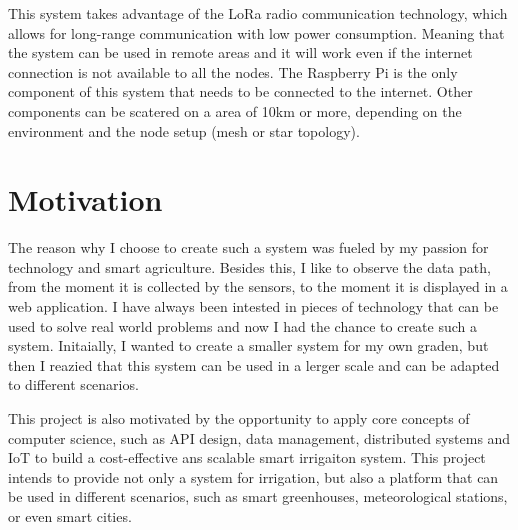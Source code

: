 This system takes advantage of the LoRa radio communication technology, 
which allows for long-range communication with low power consumption. Meaning that the system can be used in remote areas and
it will work even if the internet connection is not available to all the nodes. The Raspberry Pi is the only component of this system
that needs to be connected to the internet. Other components can be scatered on a area of 10km or more, depending on
the environment and the node setup (mesh or star topology).

\newpage
\section{Motivation}

The reason why I choose to create such a system was fueled by my passion for technology and smart agriculture. Besides this,
I like to observe the data path, from the moment it is collected by the sensors, to the moment it is displayed
in a web application. 
I have always been intested in pieces of technology that can be used to solve real world problems and now I had the chance
to create such a system.
Initaially, I wanted to create a smaller system for my own graden, but then I reazied that this system can be used in a lerger
scale and can be adapted to different scenarios.

This project is also motivated by the opportunity to apply core concepts of computer science, such as API design, data management, 
distributed systems and IoT \- to build a cost-effective ans scalable smart irrigaiton system. This project intends to provide
not only a system for irrigation, but also a platform that can be used in different scenarios, such as smart greenhouses,
meteorological stations, or even smart cities.

